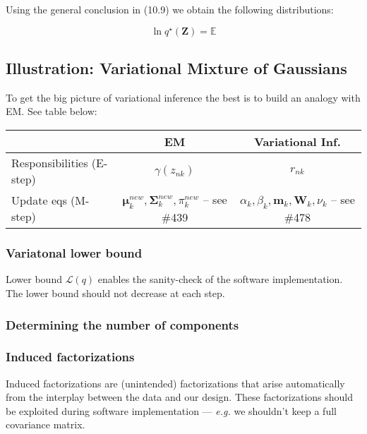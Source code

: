 \documentclass[a4paper]{article}
\newcommand{\eg}{\textit{e.g. }}
\newcommand{\mb}{\mathbf}
\newcommand{\bs}{\boldsymbol}
\begin{document}
Using the general conclusion in (10.9) we obtain the following distributions:

\begin{equation}
\ln q^{\star}(\mb{Z}) = \mathbb{E}
\end{equation}













\subsection{Illustration: Variational Mixture of Gaussians}

To get the big picture of variational inference the best is to build an analogy with EM. See table below:
%
\begin{table}
\centering
\begin{tabular}{lcc} \hline
 & EM & Variational Inf. \\\hline
 Responsibilities (E-step) & $\gamma(z_{nk})$ & $r_{nk}$ \\ 
 Update eqs (M-step) & $\bs{\mu}_k^{new}, \bs{\Sigma}_k^{new}, \pi_k^{new}$ \--- see \#439 & $\alpha_k, \beta_k, \mb{m}_k, \mb{W}_k, \nu_k$ \--- see \#478 \\ \hline
\end{tabular}
\end{table}

\subsubsection{Variatonal lower bound}
Lower bound $\mathcal{L}(q)$ enables the sanity-check of the software implementation. The lower bound should not decrease at each step.

\subsubsection{Determining the number of components}
\subsubsection{Induced factorizations} 
Induced factorizations are (unintended) factorizations that arise automatically from the interplay between the data and our design. These factorizations should be exploited during software implementation \---- \eg we shouldn't keep a full covariance matrix.
\end{document}

